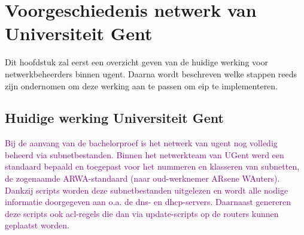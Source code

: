
\chapter{Voorgeschiedenis netwerk van Universiteit Gent}%
\label{ch:voorgeschiedenis}

Dit hoofdstuk zal eerst een overzicht geven van de huidige werking voor netwerkbeheerders binnen \acrshort{ugent}.
Daarna wordt beschreven welke stappen reeds zijn ondernomen om deze werking aan te passen om \acrlong{eip} te implementeren.

\section{Huidige werking Universiteit Gent}
\textcolor{purple}{Bij de aanvang van de bachelorproef is het netwerk van \acrshort{ugent} nog volledig beheerd via subnetbestanden. Binnen het netwerkteam van UGent werd een standaard bepaald en toegepast voor het nummeren en klasseren van subnetten, de zogenaamde ARWA-standaard (naar oud-werknemer ARsene WAuters). Dankzij scripts worden deze subnetbestanden uitgelezen en wordt alle nodige informatie doorgegeven aan o.a. de \acrshort{dns}- en \acrshort{dhcp}-servers. Daarnaast genereren deze scripts ook \acrfull{acl}-regels die dan via update-scripts op de routers kunnen geplaatst worden.}

